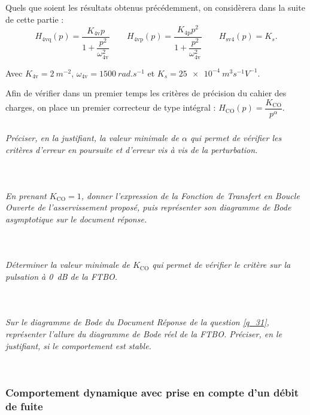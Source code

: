 \documentclass[10pt,fleqn]{article} %
\begin{document}
Quels que soient les résultats obtenus précédemment, on considèrera dans la suite de cette partie :
$$
H_{\text{4vq}}(p)=\dfrac{K_{\text{4v}}p}{1+\dfrac{p^2}{\omega^2_{\text{4v}}}} 
\quad \quad
H_{\text{4vp}}(p)=\dfrac{K_{\text{4p}}p^2}{1+\dfrac{p^2}{\omega^2_{\text{4v}}}} 
\quad \quad
H_{\text{sv4}}(p)=K_s.
$$

Avec 
$K_{\text{4v}}=\SI{2}{m^{-2}}$,
$\omega_{\text{4v}}=\SI{1500}{rad.s^{-1}}$
et $K_s = \SI{25e-4}{m^3s^{-1}V^{-1}}$.


Afin de vérifier dans un premier temps les critères de précision du cahier des charges, on place un premier
correcteur de type intégral : $H_{\text{CO}}(p)=\dfrac{K_{\text{CO}}}{p^\alpha}$.


\subparagraph{\label{q_30}}\textit{Préciser, en la justifiant, la valeur minimale de $\alpha$ qui permet de vérifier les critères d’erreur en poursuite et d’erreur vis à vis de la perturbation.}
\ifprof
\begin{corrige} ~\\

\end{corrige}
\else
\fi

\subparagraph{\label{q_31}}\textit{En prenant $K_{\text{CO}}=1$, donner l’expression de la Fonction de Transfert en Boucle Ouverte de
l’asservissement proposé, puis représenter son diagramme de Bode asymptotique sur le document réponse.}
\ifprof
\begin{corrige} ~\\

\end{corrige}
\else
\fi

\subparagraph{\label{q_32}}\textit{Déterminer la valeur minimale de $K_{\text{CO}}$ qui permet de vérifier le critère sur la pulsation à \SI{0}{dB} de la FTBO.}
\ifprof
\begin{corrige} ~\\

\end{corrige}
\else
\fi

\subparagraph{\label{q_33}}\textit{Sur le diagramme de Bode du Document Réponse de la question \ref{q_31}, représenter l’allure du
diagramme de Bode réel de la FTBO. Préciser, en le justifiant, si le comportement est stable.}
\ifprof
\begin{corrige} ~\\

\end{corrige}
\else
\fi

\subsubsection{Comportement dynamique avec prise en compte d’un débit de fuite}
\end{document}
